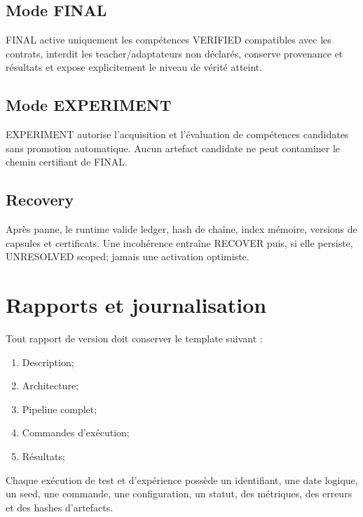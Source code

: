 \documentclass[11pt,a4paper]{report}
\begin{document}
\section{Mode FINAL}
FINAL active uniquement les compétences VERIFIED compatibles avec les contrats, interdit les teacher/adaptateurs non déclarés, conserve provenance et résultats et expose explicitement le niveau de vérité atteint.

\section{Mode EXPERIMENT}
EXPERIMENT autorise l'acquisition et l'évaluation de compétences candidates sans promotion automatique. Aucun artefact candidate ne peut contaminer le chemin certifiant de FINAL.

\section{Recovery}
Après panne, le runtime valide ledger, hash de chaîne, index mémoire, versions de capsules et certificats. Une incohérence entraîne RECOVER puis, si elle persiste, UNRESOLVED scoped; jamais une activation optimiste.

\chapter{Rapports et journalisation}
Tout rapport de version doit conserver le template suivant :
\begin{enumerate}
\item Description;
\item Architecture;
\item Pipeline complet;
\item Commandes d'exécution;
\item Résultats;
\end{enumerate}
Chaque exécution de test et d'expérience possède un identifiant, une date logique, un seed, une commande, une configuration, un statut, des métriques, des erreurs et des hashes d'artefacts.
\end{document}
